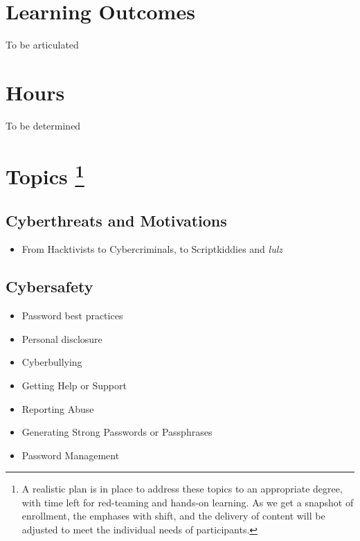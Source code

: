 \documentclass[letterpaper,10pt,english]{sphinxmanual}
\begin{document}
\section{Learning Outcomes}
\label{cybersecurity:learning-outcomes}
To be articulated


\section{Hours}
\label{cybersecurity:hours}
To be determined


\section{Topics \footnote{
A realistic plan is in place to address these topics to an appropriate degree, with time left for red-teaming and hands-on learning. As we get a snapshot of enrollment, the emphases with shift, and the delivery of content will be adjusted to meet the individual needs of participants.
}}
\label{cybersecurity:topics-2}

\subsection{Cyberthreats and Motivations}
\label{cybersecurity:cyberthreats-and-motivations}\begin{itemize}
\item {} 
From Hacktivists to Cybercriminals, to Scriptkiddies and \emph{lulz}

\end{itemize}


\subsection{Cybersafety}
\label{cybersecurity:cybersafety}\begin{itemize}
\item {} 
Password best practices

\item {} 
Personal disclosure

\item {} 
Cyberbullying

\item {} 
Getting Help or Support

\item {} 
Reporting Abuse

\item {} 
Generating Strong Passwords or Passphrases

\item {} 
Password Management

\end{itemize}
\end{document}
